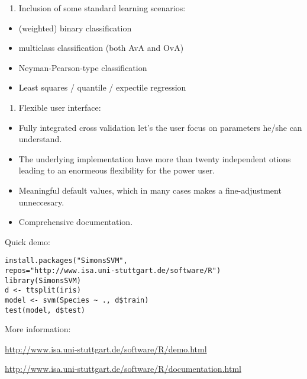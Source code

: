 \documentclass[\main/boa.tex]{subfiles}
\begin{document}
\begin{enumerate}
\def\labelenumi{\arabic{enumi}.}
\setcounter{enumi}{1}
\tightlist
\item
  Inclusion of some standard learning scenarios:
\end{enumerate}

\begin{itemize}
\tightlist
\item
  (weighted) binary classification
\item
  multiclass classification (both AvA and OvA)
\item
  Neyman-Pearson-type classification
\item
  Least squares / quantile / expectile regression
\end{itemize}

\begin{enumerate}
\def\labelenumi{\arabic{enumi}.}
\setcounter{enumi}{2}
\tightlist
\item
  Flexible user interface:
\end{enumerate}

\begin{itemize}
\tightlist
\item
  Fully integrated cross validation let's the user focus on parameters
  he/she can understand.
\item
  The underlying implementation have more than twenty independent otions
  leading to an enormeous flexibility for the power user.
\item
  Meaningful default values, which in many cases makes a fine-adjustment
  unneccesary.
\item
  Comprehensive documentation.
\end{itemize}

Quick demo:

\begin{verbatim}
install.packages("SimonsSVM",
repos="http://www.isa.uni-stuttgart.de/software/R")
library(SimonsSVM)
d <- ttsplit(iris)
model <- svm(Species ~ ., d$train)
test(model, d$test)
\end{verbatim}

More information:

\url{http://www.isa.uni-stuttgart.de/software/R/demo.html}

\url{http://www.isa.uni-stuttgart.de/software/R/documentation.html}
\end{document}
